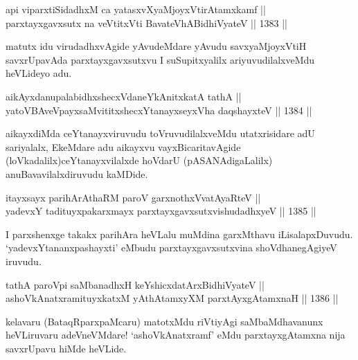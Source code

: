 \begin{shl}
api viparxtiSidadhxM ca yatasxvXyaMjoyxVtirAtamxkamf || \\
parxtayxgavxsutx na veVtitxVti BavateVhABidhiVyateV \hfill || 1383 ||  
\end{shl}

\begin{artha}
matutx idu virudadhxvAgide yAvudeMdare yAvudu savxyaMjoyxVtiH savxrUpavAda parxtayxgavxsutxvu I suSupitxyalilx ariyuvudilalxveMdu heVLideyo adu.
\end{artha}


\begin{shl}
aikAyxdanupalabidhxshecxVdaneYkAnitxkatA tathA || \\
yatoV\s BAveV\s payxsaMvititxshecxYtanayxseyxVha daqshayxteV \hfill || 1384 ||  
\end{shl}

\begin{artha}
aikayxdiMda ceYtanayxviruvudu toVruvudilalxveMdu utatxrisidare adU sariyalalx, EkeMdare adu aikayxvu vayxBicaritavAgide (loVkadalilx)ceYtanayxvilalxde hoVdarU (pASANAdigaLalilx) anuBavavilalxdiruvudu kaMDide.
\end{artha}


\begin{shl}
itayxsayx parihArAthaRM paroV garxnothxV\s vatAyaRteV || \\
yadevxY tadituyxpakarxmayx parxtayxgavxsutxvishudadhxyeV \hfill || 1385 ||  
\end{shl}


\begin{artha}
I parxshenxge takakx parihAra heVLalu muMdina garxMthavu iLisalapxDuvudu. `yadevxYtananxpashayxti' eMbudu parxtayxgavxsutxvina shoVdhanegAgiyeV iruvudu.
\end{artha}


\begin{shl}
tathA paroV\s pi saMbanadhxH keYshicxdatArxBidhiVyateV || \\
ashoVkAnatxramituyxkatxM yAthAtamxyXM parxtAyxgAtamxnaH \hfill || 1386 ||  
\end{shl}

\begin{artha}
kelavaru (BataqRparxpaMcaru) matotxMdu riVtiyAgi saMbaMdhavanunx heVLiruvaru adeVneVMdare! `ashoVkAnatxramf' eMdu parxtayxgAtamxna nija savxrUpavu hiMde heVLide.
\end{artha}

